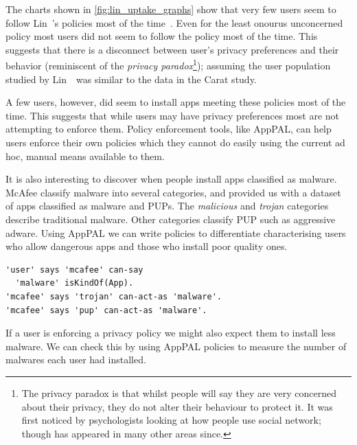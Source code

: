 \documentclass[thesis.tex]{subfiles}
\begin{document}
The charts shown in \autoref{fig:lin_uptake_graphs} show that very few users seem to follow Lin~\etal's policies most of the time~\cite{hallett_apppal_2016}.  Even for the least onourus unconcerned policy most users did not seem to follow the policy most of the time.
This suggests that there is a disconnect between user's privacy preferences and their behavior (reminiscent of the \emph{privacy paradox}\footnote{The privacy paradox is that whilst people will say they are very concerned about their privacy, they do not alter their behaviour to protect it.  It was first noticed by psychologists looking at how people use social network; though has appeared in many other areas since.}); assuming the user population studied by Lin~\etal~was similar to the data in the Carat study.

A few users, however, did seem to install apps meeting these policies most of the time.
This suggests that while users may have privacy preferences most are not attempting to enforce them.
Policy enforcement tools, like AppPAL, can help users enforce their own policies which they cannot do easily using the current ad hoc, manual means available to them.

It is also interesting to discover when people install apps classified as malware.
McAfee classify malware into several categories, and provided us with a dataset of apps classified as malware and \acp{PUP}.
The \emph{malicious} and \emph{trojan} categories describe traditional malware.
Other categories classify \ac{PUP} such as aggressive adware.
Using AppPAL we can write policies to differentiate characterising users who allow dangerous apps and those who install poor quality ones.
\begin{lstlisting}
'user' says 'mcafee' can-say
  'malware' isKindOf(App).
'mcafee' says 'trojan' can-act-as 'malware'.
'mcafee' says 'pup' can-act-as 'malware'.
\end{lstlisting}
If a user is enforcing a privacy policy we might also expect them to install less malware.
We can check this by using AppPAL policies to measure the number of malwares each user had installed.
\end{document}

